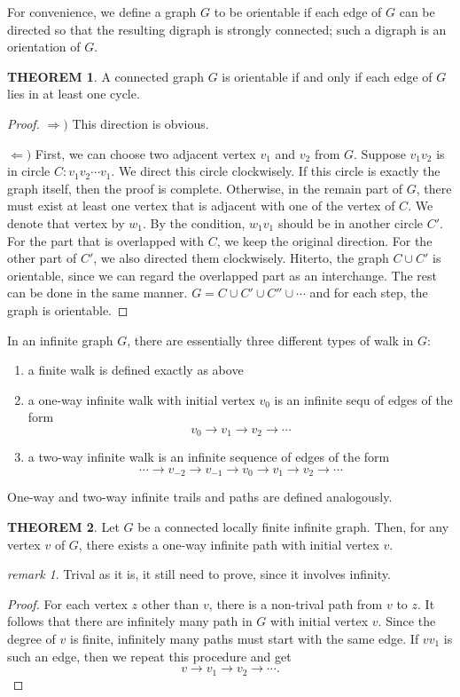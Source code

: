 \documentclass[a4paper,11pt]{article}%
\theoremstyle{remark}
\newtheorem*{remark}{remark}
\theoremstyle{definition}
\newtheorem{theorem}{THEOREM}[section]
\theoremstyle{definition}
\theoremstyle{definition}
\theoremstyle{definition}
\theoremstyle{plain}
\theoremstyle{definition}
\begin{document}
For convenience, we define a graph $G$ to be orientable if each edge of $G$
can be directed so that the resulting digraph is strongly connected; such a
digraph is an orientation of $G$.
\begin{theorem}
    A connected graph $G$ is orientable if and only if each edge of $G$ lies 
    in at least one cycle.
\end{theorem}
\begin{proof}
    $\Rightarrow)$ This direction is obvious.

    $\Leftarrow)$ First, we can choose two adjacent vertex $v_1$ and $v_2$ from $G$.
    Suppose $v_1v_2$ is in circle $C:v_1v_2\cdots v_1$.
    We direct this circle clockwisely.
    If this circle is exactly the graph itself, then the proof is complete.
    Otherwise, in the remain part of $G$, there must exist at least one vertex
    that is adjacent with one of the vertex of $C$. We denote that vertex by $w_1$.
    By the condition, $w_1v_1$ should be in another circle $C'$. For the part 
    that is overlapped with $C$, we keep the original direction. 
    For the other part of $C'$, we also directed them clockwisely.
    Hiterto, the graph $C\cup C'$ is orientable, since we can regard 
    the overlapped part as an interchange. The rest can be done in the same 
    manner. $G=C\cup C'\cup C''\cup\cdots$ and for each step, the graph is orientable.
\end{proof}
In an infinite graph $G$, there are essentially three different types of walk in $G$:
\begin{enumerate}
    \item a finite walk is defined exactly as above
    \item a one-way infinite walk with initial vertex $v_0$ is an infinite sequ of edges of the form \[v_0\rightarrow v_1\rightarrow v_2\rightarrow\cdots\]
    \item a two-way infinite walk is an infinite sequence of edges of the form \[\cdots\rightarrow v_{-2}\rightarrow v_{-1}\rightarrow v_0\rightarrow v_1\rightarrow v_2\rightarrow\cdots\]
\end{enumerate}
One-way and two-way infinite trails and paths are defined analogously.
\begin{theorem}
   Let $G$ be a connected locally finite infinite graph. Then, for any vertex $v$ of $G$,
   there exists a one-way infinite path with initial vertex $v$. 
\end{theorem}
\begin{remark}
    Trival as it is, it still need to prove, since it involves infinity.
\end{remark}
\begin{proof}
    For each vertex $z$ other than $v$, there is a non-trival path from $v$
    to $z$. It follows that there are infinitely many path in $G$ with initial vertex $v$.
    Since the degree of $v$ is finite, infinitely many paths must start with the 
    same edge. If $vv_1$ is such an edge, then we repeat this procedure and get 
    \[v\rightarrow v_1\rightarrow v_2\rightarrow\cdots.\]
\end{proof}
\end{document}
